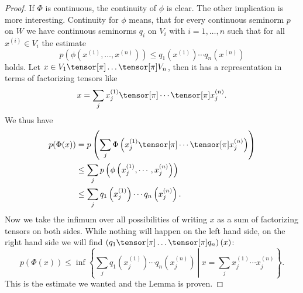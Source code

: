 \begin{proof}
	If $\Phi$ is continuous, the continuity of $\phi$ is clear. 
	The other implication is more interesting.
	Continuity for $\phi$ means, that for every continuous seminorm $p$ on 
	$W$ we have continuous seminorms $q_i$ on $V_i$ with $i = 1, \ldots, n$ 
	such that for all $x^{(i)} \in V_i$ the estimate
	\begin{equation}
		\label{LCAna:ContiFactorTensors}
		p \left(
			\phi\left( x^{(1)}, \ldots, x^{(n)} \right)
		\right)
		\leq
		q_1 \left( x^{(1)} \right) 
		\cdots 
		q_n \left( x^{(n)} \right)
	\end{equation}
	holds. Let $x \in V_1 \tensor[\pi] \ldots \tensor[\pi] V_n$, then it 
	has a representation in terms of factorizing tensors like
	\begin{equation*}
		x
		=
		\sum_j
		x_j^{(1)} 
		\tensor[\pi] \cdots \tensor[\pi] 
		x_j^{(n)}.
	\end{equation*}
	We thus have
	\begin{align*}
		p( \Phi(x) )
		& =
		p \left(
			\sum_j
			\Phi \left(
				x_j^{(1)} 
				\tensor[\pi] \cdots \tensor[\pi] 
				x_j^{(n)}
			\right)
		\right)
		\\
		& \leq
		\sum_j
		p \left(
			\phi \left(
				x_j^{(1)} 
				, \cdots ,
				x_j^{(n)}
			\right)
		\right)
		\\
		& \leq
		\sum_j
		q_1 \left( x_j^{(1)} \right) 
		\cdots 
		q_n \left( x_j^{(n)} \right).
	\end{align*}
	Now we take the infimum over all possibilities of writing $x$ as a sum of 
	factorizing tensors on both sides. While nothing will happen on the left 
	hand side, on the right hand side we will find $\left( q_1 \tensor[\pi] 
	\ldots \tensor[\pi] q_n \right)(x)$: 
	\begin{equation*}
		p( \Phi(x) )
		\leq
		\inf
		\left\{
		\left.
			\sum_j
			q_1 \left( x_j^{(1)} \right) 
			\cdots 
			q_n \left( x_j^{(n)} \right)
		\ \right| \
			x
			=
			\sum_j
			x_j^{(1)} \cdots x_j^{(n)}
		\right\}.
	\end{equation*}
	This is the estimate we wanted and the Lemma is proven.
\end{proof}


